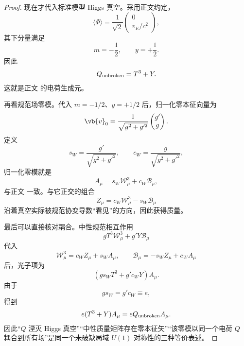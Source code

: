 \begin{proof}
现在才代入标准模型 Higgs 真空。采用正文约定，
\[
\langle\Phi\rangle
=
\frac1{\sqrt2}
\begin{pmatrix}0\\v_E/c^2\end{pmatrix},
\]
其下分量满足
\[
m=-\frac12,
\qquad
y=+\frac12.
\]
因此
\[
Q_{\rm unbroken}
=
T^3+Y.
\]
这就是正文 的电荷生成元。

再看规范场零模。代入 $m=-1/2$、$y=+1/2$ 后，归一化零本征向量为
\[
\vb{v}_0
=\frac1{\sqrt{g^2+g'^2}}
\begin{pmatrix}g'\\g\end{pmatrix}.
\]
定义
\[
s_W
=
\frac{g'}{\sqrt{g^2+g'^2}},
\qquad
c_W
=
\frac{g}{\sqrt{g^2+g'^2}},
\]
归一化零模就是
\[
A_\mu
=
s_W\mathcal W_\mu^3
+
c_W\mathcal B_\mu,
\]
与正文 一致。与它正交的组合
\[
Z_\mu
=
c_W\mathcal W_\mu^3
-
s_W\mathcal B_\mu
\]
沿着真空实际被规范协变导数“看见”的方向，因此获得质量。

最后可以直接核对耦合。中性规范相互作用
\[
gT^3\mathcal W_\mu^3
+
g'Y\mathcal B_\mu
\]
代入
\[
\mathcal W_\mu^3=c_WZ_\mu+s_WA_\mu,
\qquad
\mathcal B_\mu=-s_WZ_\mu+c_WA_\mu
\]
后，光子项为
\[
\left(
gs_WT^3+g'c_WY
\right)A_\mu.
\]
由于
\[
gs_W=g'c_W
\equiv e,
\]
得到
\[
e(T^3+Y)A_\mu
=
eQ_{\rm unbroken}A_\mu.
\]
因此“\(Q\) 湮灭 Higgs 真空”“中性质量矩阵存在零本征矢”“该零模以同一个电荷 \(Q\) 耦合到所有场”是同一个未破缺局域 \(U(1)\) 对称性的三种等价表述。
\end{proof}


